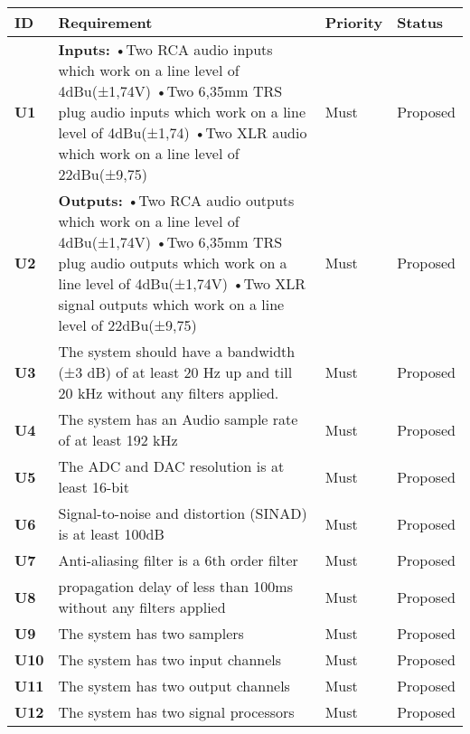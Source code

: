 \begin{longtable}{|l|p{10cm}|l|l|}
	\hline
	\textbf{ID} & \textbf{Requirement} & \textbf{Priority} & \textbf{Status}\\ \hline 
	\textbf{U1} & \textbf{Inputs:} \newline
	•Two RCA audio inputs which work on a line level of 4dBu(±1,74V)\newline
	•Two 6,35mm TRS plug audio inputs which work on a line level of 4dBu(±1,74)\newline
	•Two XLR audio which work on a line level of 22dBu(±9,75) 																	& Must	 & Proposed\\ \hline
	\textbf{U2} & \textbf{Outputs:} \newline
	•Two RCA audio outputs which work on a line level of 4dBu(±1,74V)\newline
	•Two 6,35mm TRS plug audio outputs which work on a line level of 4dBu(±1,74V)\newline
	•Two XLR signal outputs which work on a line level of 22dBu(±9,75)															& Must 	 & Proposed\\ \hline
	\textbf{U3} &The system should have a bandwidth (±3 dB) of at least 20 Hz up and till 20 kHz without any filters applied. 	& Must   & Proposed\\ \hline
	\textbf{U4} &The system has an Audio sample rate of at least 192 kHz 														& Must   & Proposed\\ \hline
	\textbf{U5} &The ADC and DAC resolution is at least 16-bit 																	& Must   & Proposed\\ \hline
	\textbf{U6} &Signal-to-noise and distortion (SINAD) is at least 100dB  														& Must   & Proposed\\ \hline
	\textbf{U7} &Anti-aliasing filter is a 6th order filter										 								& Must   & Proposed\\ \hline
	\textbf{U8} &propagation delay of less than 100ms without any filters applied												& Must   & Proposed\\ \hline
	\textbf{U9} &The system has two samplers											 										& Must   & Proposed\\ \hline
	\textbf{U10}&The system has two input channels 																				& Must   & Proposed\\ \hline
	\textbf{U11}&The system has two output channels														 						& Must   & Proposed\\ \hline
	\textbf{U12}&The system has two signal processors														 					& Must   & Proposed\\ \hline

\end{longtable}
